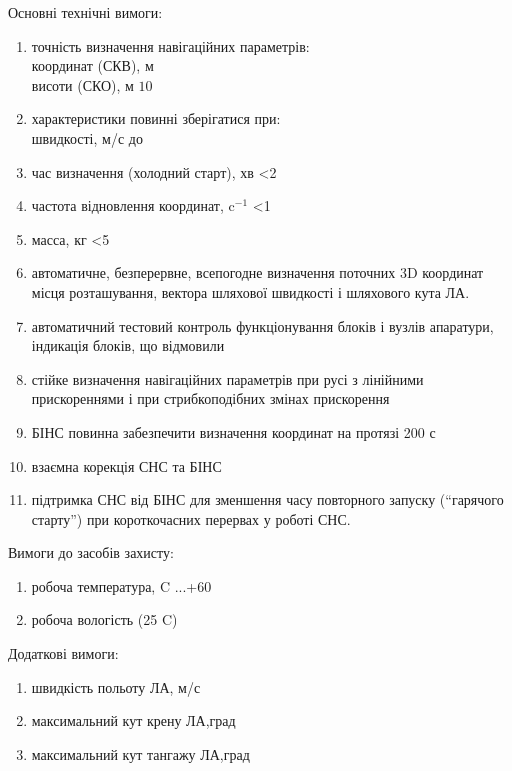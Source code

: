 Основні технічні вимоги:
\begin{enumerate}
 \item точність визначення навігаційних параметрів:\\
 координат (СКВ), м \\
  висоти (СКО), м \dotfill $10$
 \item характеристики повинні зберігатися при:\\
швидкості, м/с до 
 \item час визначення (холодний старт), хв \dotfill <2
 \item частота відновлення координат, c$^{-1}$ \dotfill <1
 \item масса, кг \dotfill <5
 \item автоматичне, безперервне, всепогодне визначення поточних 3D координат місця розташування, вектора шляхової швидкості і шляхового кута ЛА.
 \item автоматичний тестовий контроль функціонування блоків і вузлів апаратури, індикація блоків, що відмовили
 \item стійке визначення навігаційних параметрів при русі з лінійними прискореннями і при стрибкоподібних змінах прискорення
 \item БІНС повинна забезпечити визначення координат на протязі 200 с
 \item взаємна корекція СНС та БІНС
 \item підтримка СНС від БІНС для зменшення часу повторного запуску (“гарячого старту”) при короткочасних перервах у роботі СНС.
\end{enumerate}

Вимоги до засобів захисту:
\begin{enumerate}
 \item робоча температура, C     ...+60
 \item робоча вологість (25 C)    
\end{enumerate}

Додаткові вимоги:
\begin{enumerate}
 \item швидкість польоту ЛА, м/с         
 \item максимальний кут крену ЛА,град   
 \item максимальний кут тангажу ЛА,град 
\end{enumerate}


